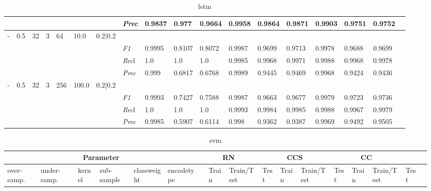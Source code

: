 \begin{table}[]
\begin{tabularx}{\textwidth}{XXXXXXX|X|XXX|XXX|XXXX}
    & & & & & & & \textit{Prec} & 0.9837 & 0.977 & 0.9664 & 0.9958 & 0.9864 & 0.9871 & 0.9903 & 0.9751 & 0.9752 \\ \midrule
    - & 0.5 & 32 & 3 & 64 &10.0 & 0.2|0.2 & & & & & & & & & \\
    & & & & & & & \textit{F1} & 0.9995 & 0.8107 & 0.8072 & 0.9987 & 0.9699        & 0.9713        & 0.9978        & 0.9688        & 0.9699        \\
    & & & & & & & \textit{Rec}l & 1.0 & 1.0 & 1.0    & 0.9985 & 0.9968    & 0.9971    & 0.9988    & 0.9968    & 0.9978    \\
    & & & & & & & \textit{Prec} & 0.999 & 0.6817 & 0.6768 & 0.9989 & 0.9445 & 0.9469 & 0.9968 & 0.9424 & 0.9436 \\ \midrule
    - & 0.5 & 32 & 3 & 256 &100.0 & 0.2|0.2 & & & & & & & & & \\
    & & & & & & & \textit{F1} & 0.9993 & 0.7427 & 0.7588 & 0.9987 & 0.9663        & 0.9677        & 0.9979        & 0.9723        & 0.9736        \\
    & & & & & & & \textit{Rec}l & 1.0 & 1.0 & 1.0    & 0.9993 & 0.9984    & 0.9985    & 0.9988    & 0.9967    & 0.9979    \\
    & & & & & & & \textit{Prec} & 0.9985 & 0.5907 & 0.6114 & 0.998 & 0.9362 & 0.9387 & 0.9969 & 0.9492 & 0.9505 \\ \midrule
    \end{tabularx}
    \caption{lstm}
    \label{tab:all_results_lstm}
    \end{table}
    
    \begin{table}[]
    \tiny
    \tabcolsep=0.11cm
    \begin{tabularx}{\textwidth}{XXXXXX|X|XXX|XXX|XXXX}
    \toprule
    \multicolumn{6}{c}{Parameter} & \multicolumn{3}{c}{RN} & \multicolumn{3}{c}{CCS} & \multicolumn{3}{c}{CC} \\ \midrule
    over-\newline samp. & under-\newline samp. & kernel &sub-\newline sample & class\newline weight & encode\newline type & & Train & Train/\newline Test & Test & Train & Train/\newline Test & Test & Train & Train/\newline Test & Test \\ \midrule
    \end{tabularx}
    \caption{svm}
    \label{tab:all_results_svm}
    \end{table}